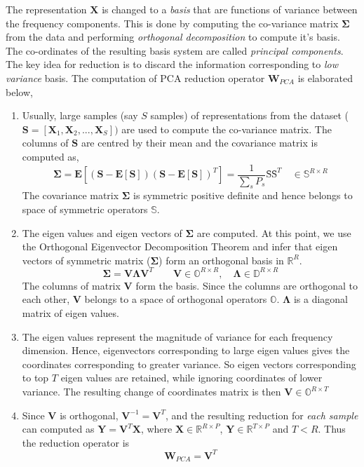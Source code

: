 The representation $\textbf{X}$ is changed to a \textit{basis} that are functions of variance between the frequency components. This is done by computing the co-variance matrix $\bm{\Sigma}$ from the data and performing \textit{orthogonal decomposition} to compute it's basis. The co-ordinates of the resulting basis system are called \textit{principal components}. The key idea for reduction is to discard the information corresponding to \textit{low variance} basis. The computation of PCA reduction operator $\textbf{W}_{PCA}$ is elaborated below,  

\begin{enumerate}[label=(\alph*)]
\item Usually, large samples (say $S$ samples) of representations from the dataset ($ \textbf{S} = [\textbf{X}_{1}, \textbf{X}_{2}, ..., \textbf{X}_{S}])$ are used to compute the co-variance matrix. The columns of $\textbf{S}$ are centred by their mean and the covariance matrix is computed as,
\[
   \bm{\Sigma} = \textbf{E}[(\textbf{S} - \textbf{E}[\textbf{S}])(\textbf{S} - \textbf{E}[\textbf{S}])^{T}] = \frac{1}{\displaystyle\sum_{s}{P_{s}}}\textbf{\^S}\textbf{\^S}^{T} \quad \in \mathbb{S}^{R \times R}
\]
The covariance matrix $\bm{\Sigma}$ is symmetric positive definite and hence belongs to space of symmetric operators $\mathbb{S}$.
\item The eigen values and eigen vectors of $\bm{\Sigma}$ are computed. At this point, we use the Orthogonal Eigenvector Decomposition Theorem and infer that eigen vectors of symmetric matrix ($\bm{\Sigma}$) form an orthogonal basis in $\mathbb{R}^{R}$. 
\[
\bm{\Sigma} = \textbf{V}\bm{\Lambda}\textbf{V}^{T} \qquad \textbf{V} \in \mathbb{O}^{R \times R}, \quad \bm{\Lambda} \in \mathbb{D}^{R \times R}
\]
The columns of matrix $\textbf{V}$ form the basis. Since the columns are orthogonal to each other, $\textbf{V}$ belongs to a space of orthogonal operators $\mathbb{O}$. $\bm{\Lambda}$ is a diagonal matrix of eigen values.

\item The eigen values represent the magnitude of variance for each frequency dimension.  Hence, eigenvectors corresponding to large eigen values gives the coordinates corresponding to greater variance. So eigen vectors corresponding to top $T$ eigen values are retained, while ignoring coordinates of lower variance. The resulting change of coordinates matrix is then $\textbf{\^V} \in \mathbb{O}^{R \times T}$
   
\item Since $\textbf{\^V}$ is orthogonal, $\textbf{\^{V}}^{-1} = \textbf{\^{V}}^{T}$, and the resulting reduction for \textit{each sample} can computed as $\textbf{Y} = \textbf{\^{V}}^{T}\textbf{X}$, where $\textbf{X} \in \mathbb{R}^{R \times P}$, $\textbf{Y} \in \mathbb{R}^{T \times P}$ and $T < R$. Thus the reduction operator is
\[
\textbf{W}_{PCA} = \textbf{\^V}^{T}
\]

\end{enumerate}   

